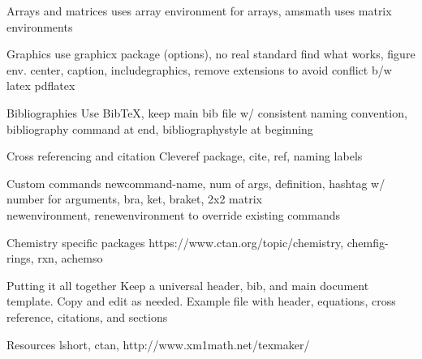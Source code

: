 \documentclass[11pt]{beamer}
\begin{document}
%
%
\begin{frame}{Arrays and matrices}
uses array environment for arrays, amsmath uses matrix environments
\end{frame}

%
%
\begin{frame}{Graphics}
use graphicx package (options), no real standard find what works, figure env. center, caption, includegraphics, remove extensions to avoid conflict b/w latex pdflatex
\end{frame}

%
%
\begin{frame}{Bibliographies}
Use BibTeX, keep main bib file w/ consistent naming convention, bibliography command at end, bibliographystyle at beginning
\end{frame}

%
%
\begin{frame}{Cross referencing and citation}
Cleveref package, cite, ref, naming labels
\end{frame}

%
%
\begin{frame}{Custom commands}
newcommand-name, num of args, definition, hashtag w/ number for arguments, bra, ket, braket, 2x2 matrix \\
newenvironment, renewenvironment to override existing commands
\end{frame}

%
%
\begin{frame}{Chemistry specific packages}
https://www.ctan.org/topic/chemistry, chemfig-rings, rxn, achemso
\end{frame}

%
%
\begin{frame}{Putting it all together}
Keep a universal header, bib, and main document template. Copy and edit as needed. Example file with header, equations, cross reference, citations, and sections
\end{frame}

%
%
\begin{frame}{Resources}
lshort, ctan, http://www.xm1math.net/texmaker/
\end{frame}
\end{document}
